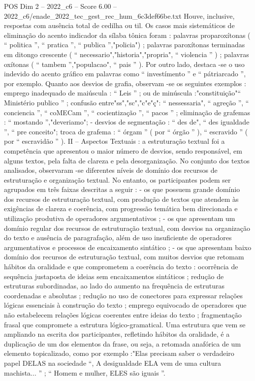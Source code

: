\begin{textsample}{POS Dim 2 – 2022\_c6 – Score 6.00 – 2022\_c6/enade\_2022\_tec\_gest\_rec\_hum\_6c3def66be.txt}
Houve, inclusive, respostas com ausência total de cedilha ou til.
Os casos mais sistemáticos de eliminação do acento indicador da sílaba tônica foram : palavras proparoxítonas ( “ politica ”, “ pratica ”, “ publica ”,"policia") ; palavras paroxítonas terminadas em ditongo crescente ( “ necessario","historia","propria", “ violencia ” ) ; palavras oxítonas ( “ tambem ”,"populacao", “ pais ” ).
Por outro lado, destaca -se o uso indevido do acento gráfico em palavras como “ investímento ” e “ pátriarcado ”, por exemplo.
Quanto aos desvios de grafia, observam -se os seguintes exemplos : emprego inadequado de maiúscula : “ Leis ” ; ou de minúscula :"constituição"“ Ministério publico ” ; confusão entre"ss","sc","c"e"ç": “ nessessaria", “ agreção ”, “ conciencia ”, “ coMECam ”, “ cocientização ”, “ pacos ” ; eliminação de grafemas : “ mostando ”,"deveriamo"; - desvios de segmentação : “ des de", “ des igualdade ”, “ pre conceito"; troca de grafema : “ órgam ” ( por “ órgão ” ), “ escravido ” ( por “ escravidão ” ).
II – Aspectos Textuais : a estruturação textual foi a competência que apresentou o maior número de desvios, sendo responsável, em alguns textos, pela falta de clareza e pela desorganização.
No conjunto dos textos analisados, observaram -se diferentes níveis de domínio dos recursos de estruturação e organização textual.
No entanto, os participantes podem ser agrupados em três faixas descritas a seguir : - os que possuem grande domínio dos recursos de estruturação textual, com produção de textos que atendem às exigências de clareza e coerência, com progressão temática bem direcionada e utilização produtiva de operadores argumentativos ; - os que apresentam um domínio regular dos recursos de estruturação textual, com desvios na organização do texto e ausência de paragrafação, além de uso insuficiente de operadores argumentativos e processos de encaixamento sintático ; - os que apresentam baixo domínio dos recursos de estruturação textual, com muitos desvios que retomam hábitos da oralidade e que comprometem a coerência do texto : ocorrência de sequência justaposta de ideias sem encaixamentos sintáticos ; redução de estruturas subordinadas, ao lado do aumento na frequência de estruturas coordenadas e absolutas ; redução no uso de conectores para expressar relações lógicas essenciais à construção do texto ; emprego equivocado de operadores que não estabelecem relações lógicas coerentes entre ideias do texto ; fragmentação frasal que compromete a estrutura lógico-gramatical.
Uma estrutura que vem se ampliando na escrita dos participantes, refletindo hábitos da oralidade, é a duplicação de um dos elementos da frase, ou seja, a retomada anafórica de um elemento topicalizado, como por exemplo :"Elas precisam saber o verdadeiro papel DELAS na sociedade “, A desigualdade ELA vem de uma cultura machista... ” ; “ Homem e mulher, ELES são iguais ”.

\end{textsample}
